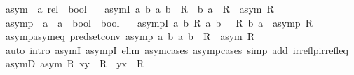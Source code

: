 \begin{isabellebody}
\ asym\ {\isacharcolon}{\kern0pt}{\isacharcolon}{\kern0pt}\ {\isachardoublequoteopen}{\isacharprime}{\kern0pt}a\ rel\ {\isasymRightarrow}\ bool{\isachardoublequoteclose}\isanewline
\ \ \ asymI{\isacharcolon}{\kern0pt}\ {\isachardoublequoteopen}{\isacharparenleft}{\kern0pt}{\isasymAnd}a\ b{\isachardot}{\kern0pt}\ {\isacharparenleft}{\kern0pt}a{\isacharcomma}{\kern0pt}\ b{\isacharparenright}{\kern0pt}\ {\isasymin}\ R\ {\isasymLongrightarrow}\ {\isacharparenleft}{\kern0pt}b{\isacharcomma}{\kern0pt}\ a{\isacharparenright}{\kern0pt}\ {\isasymnotin}\ R{\isacharparenright}{\kern0pt}\ {\isasymLongrightarrow}\ asym\ R{\isachardoublequoteclose}\isanewline
\isanewline
{}\isamarkupfalse%
\ asymp\ {\isacharcolon}{\kern0pt}{\isacharcolon}{\kern0pt}\ {\isachardoublequoteopen}{\isacharparenleft}{\kern0pt}{\isacharprime}{\kern0pt}a\ {\isasymRightarrow}\ {\isacharprime}{\kern0pt}a\ {\isasymRightarrow}\ bool{\isacharparenright}{\kern0pt}\ {\isasymRightarrow}\ bool{\isachardoublequoteclose}\isanewline
\ \ \ asympI{\isacharcolon}{\kern0pt}\ {\isachardoublequoteopen}{\isacharparenleft}{\kern0pt}{\isasymAnd}a\ b{\isachardot}{\kern0pt}\ R\ a\ b\ {\isasymLongrightarrow}\ {\isasymnot}\ R\ b\ a{\isacharparenright}{\kern0pt}\ {\isasymLongrightarrow}\ asymp\ R{\isachardoublequoteclose}\isanewline
\isanewline
{}\isamarkupfalse%
\ asymp{\isacharunderscore}{\kern0pt}asym{\isacharunderscore}{\kern0pt}eq\ {\isacharbrackleft}{\kern0pt}pred{\isacharunderscore}{\kern0pt}set{\isacharunderscore}{\kern0pt}conv{\isacharbrackright}{\kern0pt}{\isacharcolon}{\kern0pt}\ {\isachardoublequoteopen}asymp\ {\isacharparenleft}{\kern0pt}{\isasymlambda}a\ b{\isachardot}{\kern0pt}\ {\isacharparenleft}{\kern0pt}a{\isacharcomma}{\kern0pt}\ b{\isacharparenright}{\kern0pt}\ {\isasymin}\ R{\isacharparenright}{\kern0pt}\ {\isasymlongleftrightarrow}\ asym\ R{\isachardoublequoteclose}\isanewline
%
\isadelimproof
\ \ %
\endisadelimproof
%
\isatagproof
{}\isamarkupfalse%
\ {\isacharparenleft}{\kern0pt}auto\ intro{\isacharbang}{\kern0pt}{\isacharcolon}{\kern0pt}\ asymI\ asympI\ elim{\isacharcolon}{\kern0pt}\ asym{\isachardot}{\kern0pt}cases\ asymp{\isachardot}{\kern0pt}cases\ simp\ add{\isacharcolon}{\kern0pt}\ irreflp{\isacharunderscore}{\kern0pt}irrefl{\isacharunderscore}{\kern0pt}eq{\isacharparenright}{\kern0pt}%
\endisatagproof
{\isafoldproof}%
%
\isadelimproof
\isanewline
%
\endisadelimproof
\isanewline
{}\isamarkupfalse%
\ asymD{\isacharcolon}{\kern0pt}\ {\isachardoublequoteopen}{\isasymlbrakk}asym\ R{\isacharsemicolon}{\kern0pt}\ {\isacharparenleft}{\kern0pt}x{\isacharcomma}{\kern0pt}y{\isacharparenright}{\kern0pt}\ {\isasymin}\ R{\isasymrbrakk}\ {\isasymLongrightarrow}\ {\isacharparenleft}{\kern0pt}y{\isacharcomma}{\kern0pt}x{\isacharparenright}{\kern0pt}\ {\isasymnotin}\ R{\isachardoublequoteclose}\isanewline

\end{isabellebody}
